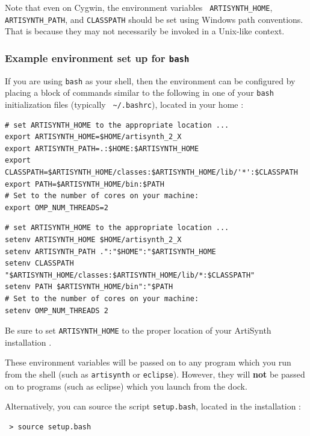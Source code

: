Note that even on Cygwin, the environment variables {\tt
ARTISYNTH\_HOME}, {\tt ARTISYNTH\_PATH}, and {\tt CLASSPATH} should be
set using Windows path conventions. That is because they may not
necessarily be invoked in a Unix-like context.
\fi %

\ifWindows\else %
\subsubsection{Example environment set up for {\tt bash}}
\label{BashEnvironmentSetup}

If you are using {\tt bash} as your shell, then the environment can be
configured by placing a block of commands similar to the following in
one of your {\tt bash} initialization files (typically {\tt
\textasciitilde/.bashrc}), located in your home \directory{}:

\ifLinux
\begin{lstlisting}[]
# set ARTISYNTH_HOME to the appropriate location ...
export ARTISYNTH_HOME=$HOME/artisynth_2_X
export ARTISYNTH_PATH=.:$HOME:$ARTISYNTH_HOME
export CLASSPATH=$ARTISYNTH_HOME/classes:$ARTISYNTH_HOME/lib/'*':$CLASSPATH
export PATH=$ARTISYNTH_HOME/bin:$PATH
# Set to the number of cores on your machine:
export OMP_NUM_THREADS=2 
\end{lstlisting}
\else\ifMacOS
\begin{lstlisting}[]
# set ARTISYNTH_HOME to the appropriate location ...
setenv ARTISYNTH_HOME $HOME/artisynth_2_X
setenv ARTISYNTH_PATH .":"$HOME":"$ARTISYNTH_HOME
setenv CLASSPATH "$ARTISYNTH_HOME/classes:$ARTISYNTH_HOME/lib/*:$CLASSPATH"
setenv PATH $ARTISYNTH_HOME/bin":"$PATH
# Set to the number of cores on your machine:
setenv OMP_NUM_THREADS 2 
\end{lstlisting}
\fi %
\fi %

Be sure to set {\tt ARTISYNTH\_HOME} to the proper location of your
ArtiSynth installation \directory{}.

These environment variables will be passed on to any program which you
run from the shell (such as {\tt artisynth} or {\tt eclipse}).
\ifMacOS
However, they will {\bf not} be passed on to programs (such as eclipse)
which you launch from the dock.
\fi

Alternatively, you can source the script {\tt setup.bash}, located in
the installation \directory{}:

\begin{verbatim}
 > source setup.bash
\end{verbatim}

